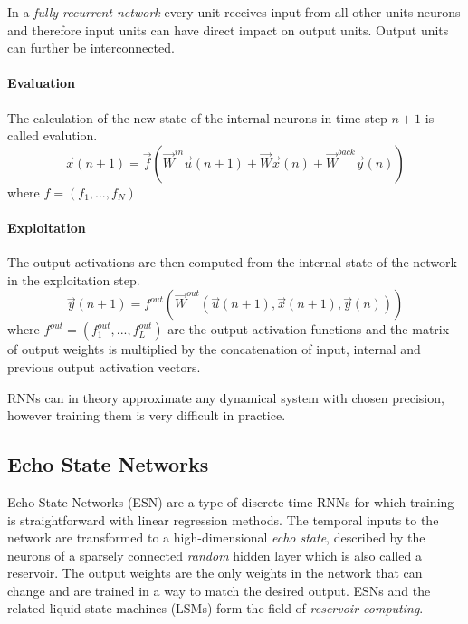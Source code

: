 In a \emph{fully recurrent network} every unit receives input from all other units neurons and therefore input units can have direct impact on output units. Output units can further be interconnected.\par

\paragraph{Evaluation}
The calculation of the new state of the internal neurons in time-step $n+1$ is called evalution. 
\[
\vec{x}(n+1)=\vec{f}(\vec{W}^{in}\vec{u}(n+1)+\vec{W}\vec{x}(n)+\vec{W}^{back}\vec{y}(n))
\]
where $f=(f_1,...,f_N)$
\paragraph{Exploitation}
The output activations are then computed from the internal state of the network in the exploitation step.
\[
\vec{y}(n+1)=f^{out}(\vec{W}^{out}(\vec{u}(n+1),\vec{x}(n+1),\vec{y}(n)))
\]
where $f^{out}=(f^{out}_1,...,f^{out}_L)$ are the output activation functions and the matrix of output weights is multiplied by the concatenation of input, internal and previous output activation vectors.\par

RNNs can in theory approximate any dynamical system with chosen precision, however training them is very difficult in practice. 

\subsection*{Echo State Networks}
Echo State Networks (ESN) are a type of discrete time RNNs for which training is straightforward with linear regression methods.  The temporal inputs to the network are transformed to a high-dimensional \emph{echo state}, described by the neurons of a sparsely connected \emph{random} hidden layer which is also called a reservoir. The output weights are the only weights in the network that can change and are trained in a way to match the desired output. ESNs and the related liquid state machines (LSMs) form the field of \emph{reservoir computing}.

